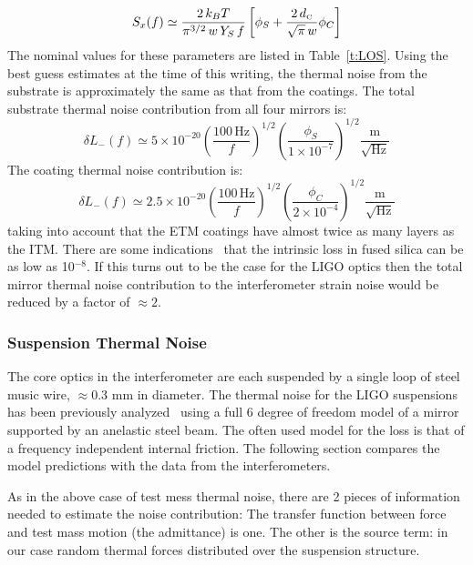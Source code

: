 \begin{equation}
\label{eq:InternalThermal}
S_x(f) \simeq  \frac{2 \, k_B T}{\pi^{3/2} \, w \, Y_S \, f} \left[ \phi_S +
                   \frac{2 \, d_{\mbox{\tiny C}}}{\sqrt{\pi} \, w} \phi_C \right]
\end{equation}
The nominal values for these parameters are listed in Table~\ref{t:LOS}. Using the best
guess estimates at the time of this writing, the thermal noise from the substrate
is approximately the same as that from the coatings. The total substrate thermal noise
contribution from all four mirrors is:
\begin{equation}
\delta L_{-}(f) \simeq 5 \times 10^{-20} 
                  \left(\frac{100 \, \mbox{Hz}}{f}\right)^{1/2}
                  \left(\frac{\phi_S}{1 \times 10^{-7}}\right)^{1/2}
                  \frac{\mbox{m}}{\sqrt{\mbox{Hz}}}
\end{equation} 
The coating thermal noise contribution is:
\begin{equation}
\delta L_{-}(f) \simeq 2.5 \times 10^{-20} 
                  \left(\frac{100 \, \mbox{Hz}}{f}\right)^{1/2}
                  \left(\frac{\phi_C}{2 \times 10^{-4}}\right)^{1/2}
                  \frac{\mbox{m}}{\sqrt{\mbox{Hz}}}
\end{equation}
taking into account that the ETM coatings have almost twice as many layers as the
ITM. There are some indications~\cite{Gregg:Pie} that the intrinsic loss in fused
silica can be as low as 10$^{-8}$. If this turns out to be the case for the LIGO optics
then the total mirror thermal noise contribution to the interferometer strain noise
would be reduced by a factor of $\approx2$.

\subsubsection{Suspension Thermal Noise}
\label{sec:SUSthermal}
The core optics in the interferometer are each suspended by a single loop
of steel music wire, $\approx$0.3 mm in diameter. The thermal noise for the LIGO 
suspensions has been previously analyzed~\cite{Gaby:Thermal} using a full 6 
degree of freedom model of a mirror supported by an anelastic steel beam. 
The often used model for the loss is that of a frequency independent internal
friction. The following section compares the model predictions with the data 
from the interferometers.

As in the above case of test mess thermal noise, there are 2 pieces of
information needed to estimate the noise contribution: The transfer function
between force and test mass motion (the admittance) is one. The other is the
source term: in our case random thermal forces distributed over the suspension
structure.

